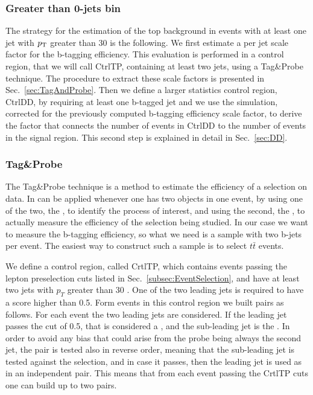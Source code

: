 \subsubsection{Greater than 0-jets bin}
The strategy for the estimation of the top background in events with at least one jet with $p_\mathrm{T}$ greater than 30 \GeV is the following. We first estimate a per jet scale factor for the b-tagging efficiency. This evaluation is performed in a control region, that we will call CtrlTP, containing at least two jets, using a Tag\&Probe technique. The procedure to extract these scale factors is presented in Sec.~\ref{sec:TagAndProbe}. Then we define a larger statistics control region, CtrlDD, by requiring at least one b-tagged jet and we use the simulation, corrected for the previously computed b-tagging efficiency scale factor, to derive the factor that connects the number of events in CtrlDD to the number of events in the signal region. This second step is explained in detail in Sec.~\ref{sec:DD}. 

\subsubsection{Tag\&Probe \label{sec:TagAndProbe}}
The Tag\&Probe technique is a method to estimate the efficiency of a selection on data. In can be applied whenever one has two objects in one event, by using one of the two, the \tg{}, to identify the process of interest, and using the second, the \probe{}, to actually measure the efficiency of the selection being studied. In our case we want to measure the b-tagging efficiency, so what we need is a sample with two b-jets per event. The easiest way to construct such a sample is to select $t\bar{t}$ events.

We define a control region, called CrtlTP, which contains events passing the lepton preselection cuts listed in Sec.~\ref{subsec:EventSelection}, and have at least two jets with $p_{T}$ greater than 30 \GeV.
One of the two leading jets is required to have a \jpb score higher than 0.5. Form events in this control region we built \tp{} pairs as follows. For each event the two leading jets are considered. If the leading jet passes the \jpb cut of 0.5, that is considered a \tg{}, and the sub-leading jet is the \probe{}. In order to avoid any bias that could arise from the probe being always the second jet, the pair is tested also in reverse order, meaning that the sub-leading jet is tested against the \tg{} selection, and in case it passes, then the leading jet is used as \probe{} in an independent \tp{} pair. This means that from each event passing the CrtlTP cuts one can build up to two \tp{} pairs. 


